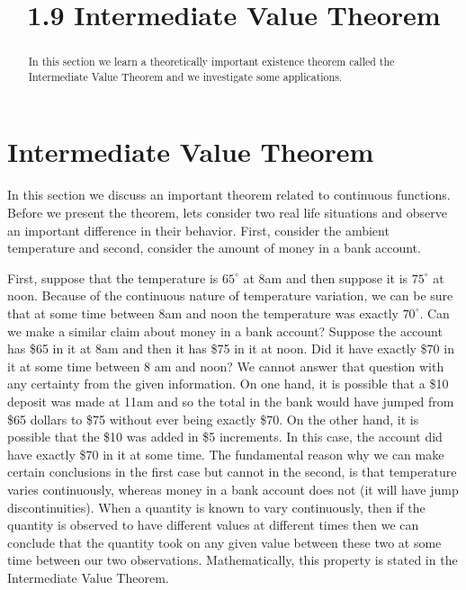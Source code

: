 \documentclass{ximera}
\title{1.9 Intermediate Value Theorem}
\begin{document}
\begin{abstract}
In this section we learn a theoretically important existence theorem called the Intermediate Value Theorem
and we investigate some applications.
\end{abstract}

\maketitle

\section{Intermediate Value Theorem}



In this section we discuss an important theorem related to continuous functions. Before we present the theorem, 
lets consider two real life situations and observe an important difference in their behavior. 
First, consider the ambient temperature and second, consider the amount of money in a bank account.

First, suppose that the temperature is $65^{\circ}$ at 8am and then suppose it is $75^{\circ}$ at noon. 
Because of the continuous nature of temperature variation, we can be sure that at some time 
between 8am and noon  the temperature was exactly $70^{\circ}$.
Can we make a similar claim about money in a bank account?  
Suppose the account has \$65  in it at 8am and then it has \$75 in it at noon.  
Did it have exactly \$70 in it at some time between 8 am and noon? 
We cannot answer that question with any certainty from the given information.  
On one hand, it is possible that a \$10 deposit was made at 11am and so the total in the 
bank would have jumped from \$65 dollars to \$75 without ever being exactly \$70. 
On the other hand, it is possible that the \$10 was added in \$5 increments. In this case, the account did have 
exactly \$70 in it at some time.
The fundamental reason why we can make certain conclusions in the first case but cannot in the second, 
is that temperature varies continuously, whereas money in a bank account does not 
(it will have jump discontinuities).  
When a quantity is known to vary continuously, then if the quantity is observed to have different 
values at different times then we can conclude that the quantity took on any given value between these 
two at some time between our two observations. Mathematically, this property is stated in the 
Intermediate Value Theorem.
\end{document}
